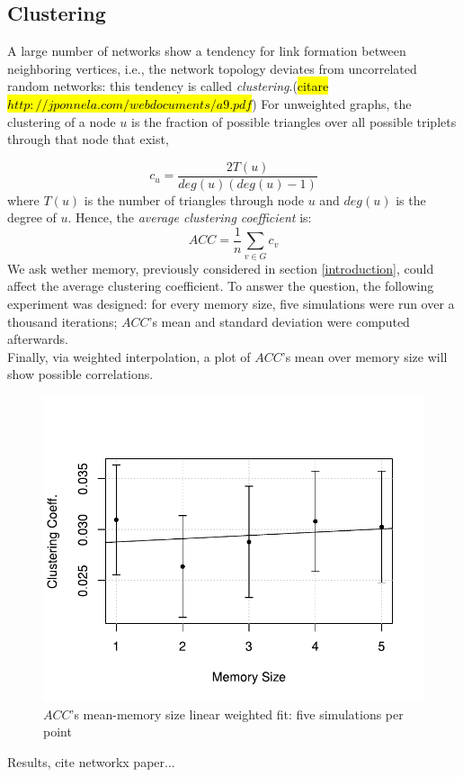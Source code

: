 \subsection{Clustering} \label{clustering}
A large number of networks show a tendency for link formation between neighboring vertices, i.e., the network topology deviates from uncorrelated random networks: this tendency is called \textit{clustering}.(\hl{citare $http://jponnela.com/webdocuments/a9.pdf$}) 
For unweighted graphs, the clustering of a node $u$ is the fraction of possible triangles over all possible triplets  through that node that exist,

\begin{equation}
\label{eq:clustering}
c_u = \frac{2 T(u)}{deg(u)(deg(u)-1)}
\end{equation}
where $T(u)$ is the number of triangles through node $u$ and $deg(u)$ is the degree of $u$.
Hence, the \textit{average clustering coefficient}  is:
\begin{equation}
\label{eq:average_clustering}
ACC = \frac{1}{n}\sum_{v \in G} c_v
\end{equation}
We ask wether memory, previously considered in section \ref{introduction}, could affect the average clustering coefficient.
To answer the question, the following experiment was designed:
for every memory size, five simulations were run over a thousand iterations; $ACC$'s mean and standard deviation were computed afterwards.\\
Finally, via weighted interpolation, a plot of $ACC$'s mean over memory size will show possible correlations. 
\begin{figure}[h]
  \centering
  \includegraphics[trim={0cm 0cm 0cm 1cm},clip,width=.8\columnwidth]{img/clustering.pdf}
  \caption{$ACC$'s mean-memory size linear weighted fit: five simulations per point}
  \label{fig:clustering}
\end{figure}
Results, cite networkx paper...